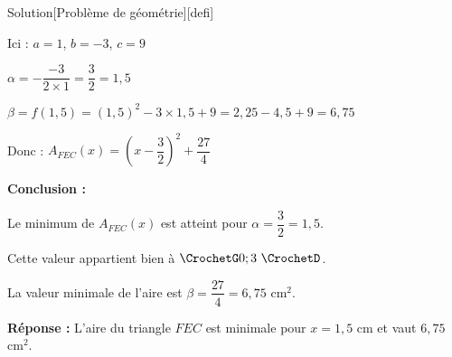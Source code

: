 \documentclass[a4paper,11pt,fleqn]{article}
\newcommand{\intervalle}[2]{\CrochetG #1 ; #2\,\,\CrochetD}
\begin{document}
\begin{bfEnv}{Solution}[Problème de géométrie][defi]
\begin{tcbenumerate}[2]
Ici : $a = 1$, $b = -3$, $c = 9$

$\alpha = -\dfrac{-3}{2 \times 1} = \dfrac{3}{2} = 1{,}5$

$\beta = f(1{,}5) = (1{,}5)^2 - 3 \times 1{,}5 + 9 = 2{,}25 - 4{,}5 + 9 = 6{,}75$

Donc : $A_{FEC}(x) = \left(x-\dfrac{3}{2}\right)^2 + \dfrac{27}{4}$


\tcbitem \textbf{Conclusion :}

Le minimum de $A_{FEC}(x)$ est atteint pour $\alpha = \dfrac{3}{2} = 1{,}5$.

Cette valeur appartient bien à $\intervalle{0}{3}$.

La valeur minimale de l'aire est $\beta = \dfrac{27}{4} = 6{,}75$ cm$^2$.

\textbf{Réponse :} L'aire du triangle $FEC$ est minimale pour $x = 1{,}5$ cm et vaut $6{,}75$ cm$^2$.
\end{tcbenumerate}

\end{bfEnv}
\end{document}
